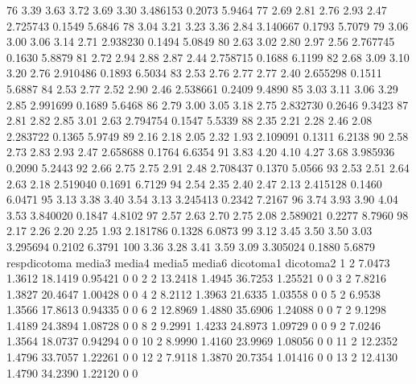 \documentclass[12pt]{article}
\begin{document}
\begin{Schunk}
\begin{Soutput}
76     3.39    3.63    3.72    3.69    3.30 3.486153  0.2073 5.9464
77     2.69    2.81    2.76    2.93    2.47 2.725743  0.1549 5.6846
78     3.04    3.21    3.23    3.36    2.84 3.140667  0.1793 5.7079
79     3.06    3.00    3.06    3.14    2.71 2.938230  0.1494 5.0849
80     2.63    3.02    2.80    2.97    2.56 2.767745  0.1630 5.8879
81     2.72    2.94    2.88    2.87    2.44 2.758715  0.1688 6.1199
82     2.68    3.09    3.10    3.20    2.76 2.910486  0.1893 6.5034
83     2.53    2.76    2.77    2.77    2.40 2.655298  0.1511 5.6887
84     2.53    2.77    2.52    2.90    2.46 2.538661  0.2409 9.4890
85     3.03    3.11    3.06    3.29    2.85 2.991699  0.1689 5.6468
86     2.79    3.00    3.05    3.18    2.75 2.832730  0.2646 9.3423
87     2.81    2.82    2.85    3.01    2.63 2.794754  0.1547 5.5339
88     2.35    2.21    2.28    2.46    2.08 2.283722  0.1365 5.9749
89     2.16    2.18    2.05    2.32    1.93 2.109091  0.1311 6.2138
90     2.58    2.73    2.83    2.93    2.47 2.658688  0.1764 6.6354
91     3.83    4.20    4.10    4.27    3.68 3.985936  0.2090 5.2443
92     2.66    2.75    2.75    2.91    2.48 2.708437  0.1370 5.0566
93     2.53    2.51    2.64    2.63    2.18 2.519040  0.1691 6.7129
94     2.54    2.35    2.40    2.47    2.13 2.415128  0.1460 6.0471
95     3.13    3.38    3.40    3.54    3.13 3.245413  0.2342 7.2167
96     3.74    3.93    3.90    4.04    3.53 3.840020  0.1847 4.8102
97     2.57    2.63    2.70    2.75    2.08 2.589021  0.2277 8.7960
98     2.17    2.26    2.20    2.25    1.93 2.181786  0.1328 6.0873
99     3.12    3.45    3.50    3.50    3.03 3.295694  0.2102 6.3791
100    3.36    3.28    3.41    3.59    3.09 3.305024  0.1880 5.6879
    respdicotoma  media3 media4  media5  media6 dicotoma1 dicotoma2
1              2  7.0473 1.3612 18.1419 0.95421         0         0
2              2 13.2418 1.4945 36.7253 1.25521         0         0
3              2  7.8216 1.3827 20.4647 1.00428         0         0
4              2  8.2112 1.3963 21.6335 1.03558         0         0
5              2  6.9538 1.3566 17.8613 0.94335         0         0
6              2 12.8969 1.4880 35.6906 1.24088         0         0
7              2  9.1298 1.4189 24.3894 1.08728         0         0
8              2  9.2991 1.4233 24.8973 1.09729         0         0
9              2  7.0246 1.3564 18.0737 0.94294         0         0
10             2  8.9990 1.4160 23.9969 1.08056         0         0
11             2 12.2352 1.4796 33.7057 1.22261         0         0
12             2  7.9118 1.3870 20.7354 1.01416         0         0
13             2 12.4130 1.4790 34.2390 1.22120         0         0

\end{Soutput}
\end{Schunk}
\end{document}
